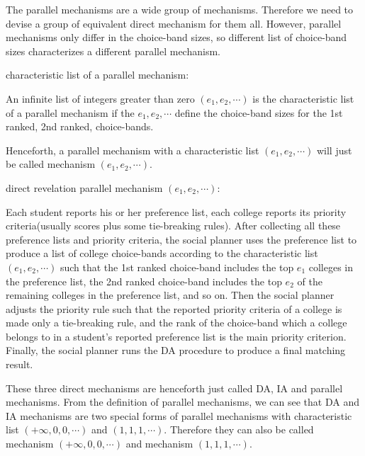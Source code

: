 The parallel mechanisms are a wide group of mechanisms. Therefore we need to devise a group of equivalent direct mechanism for them all. However,
parallel mechanisms only differ in the choice-band sizes, so different list of choice-band sizes characterizes a different parallel mechanism.

\begin{definition*} characteristic list of a parallel mechanism:
  
  An infinite list of integers greater than zero $(e_1,e_2,\cdots)$ is the characteristic list of a parallel mechanism if the $e_1,e_2,\cdots$
  define the choice-band sizes for the 1st ranked, 2nd ranked, \cdots  choice-bands.
\end{definition*}

Henceforth, a parallel mechanism with a characteristic list $(e_1,e_2,\cdots)$ will just be called mechanism $(e_1,e_2,\cdots)$.


\begin{definition*}direct revelation parallel mechanism $(e_1,e_2,\cdots)$:

  Each student reports his or her preference list, each college reports its priority
  criteria(usually scores plus some tie-breaking rules). After
  collecting all these preference lists and priority criteria, the
  social planner uses the preference list to produce a list of college
  choice-bands according to the characteristic list $(e_1,e_2,\cdots)$
  such that the 1st ranked choice-band
  includes the top $e_1$ colleges in the preference list, the 2nd
  ranked choice-band includes the top $e_2$ of the remaining colleges in the preference list, and so on. Then the social planner adjusts the
  priority rule such that the reported priority criteria of a college
  is made only a tie-breaking rule, and the rank of the choice-band
  which a college belongs to in a student's reported preference list
  is the main priority criterion. Finally, the social planner runs the
  DA procedure to produce a final matching result.
\end{definition*}

These three direct mechanisms are henceforth just called DA, IA and parallel mechanisms.
From the definition of parallel mechanisms, we can see that DA and IA mechanisms are two special forms of parallel mechanisms with characteristic
list $(+\infty,0,0,\cdots)$ and $(1,1,1,\cdots)$. Therefore they can also be called mechanism $(+\infty,0,0,\cdots)$ and mechanism $(1,1,1,\cdots)$.





